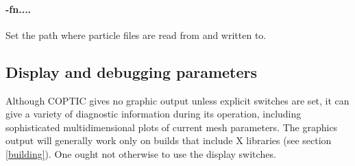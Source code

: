 \documentclass[12pt]{article}
\begin{document}
\paragraph{-fn....} Set the path where particle files are read from
and written to.

\subsection{Display and debugging parameters}

Although COPTIC gives no graphic output unless explicit switches are
set, it can give a variety of diagnostic information during its
operation, including sophisticated multidimensional plots of current
mesh parameters.  The graphics output will generally work only on
builds that include X libraries (see section \ref{building}). One
ought not otherwise to use the display switches.
\end{document}
